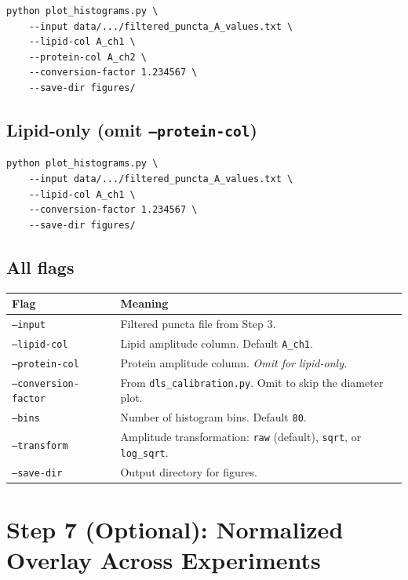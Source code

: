 \documentclass[11pt]{article}
\newcommand{\code}[1]{\texttt{#1}}
\newcommand{\flag}[1]{\texttt{#1}}
\begin{document}
\begin{lstlisting}
python plot_histograms.py \
    --input data/.../filtered_puncta_A_values.txt \
    --lipid-col A_ch1 \
    --protein-col A_ch2 \
    --conversion-factor 1.234567 \
    --save-dir figures/
\end{lstlisting}

\subsection*{Lipid-only (omit \texttt{--protein-col})}

\begin{lstlisting}
python plot_histograms.py \
    --input data/.../filtered_puncta_A_values.txt \
    --lipid-col A_ch1 \
    --conversion-factor 1.234567 \
    --save-dir figures/
\end{lstlisting}

\subsection*{All flags}

\begin{tabularx}{\linewidth}{l X}
\toprule
\textbf{Flag} & \textbf{Meaning} \\
\midrule
\flag{--input}              & Filtered puncta file from Step 3. \\
\flag{--lipid-col}          & Lipid amplitude column. Default
                              \code{A\_ch1}. \\
\flag{--protein-col}        & Protein amplitude column. \emph{Omit
                              for lipid-only.} \\
\flag{--conversion-factor}  & From \code{dls\_calibration.py}. Omit to
                              skip the diameter plot. \\
\flag{--bins}               & Number of histogram bins. Default
                              \code{80}. \\
\flag{--transform}          & Amplitude transformation: \code{raw}
                              (default), \code{sqrt}, or \code{log\_sqrt}. \\
\flag{--save-dir}           & Output directory for figures. \\
\bottomrule
\end{tabularx}

\section{Step 7 (Optional): Normalized Overlay Across Experiments}
\end{document}
